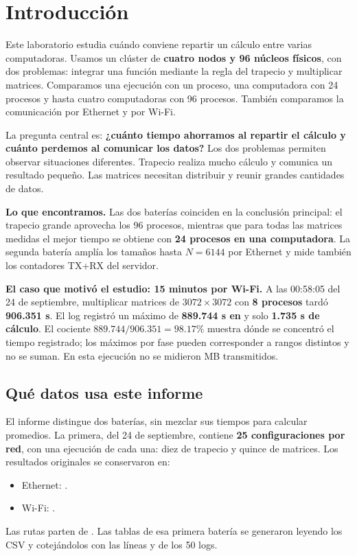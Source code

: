 \section{Introducción}

Este laboratorio estudia cuándo conviene repartir un cálculo entre varias computadoras. Usamos un clúster de \textbf{cuatro nodos y 96 núcleos físicos}, con dos problemas: integrar una función mediante la regla del trapecio y multiplicar matrices. Comparamos una ejecución con un proceso, una computadora con 24 procesos y hasta cuatro computadoras con 96 procesos. También comparamos la comunicación por Ethernet y por Wi-Fi.

La pregunta central es: \textbf{¿cuánto tiempo ahorramos al repartir el cálculo y cuánto perdemos al comunicar los datos?} Los dos problemas permiten observar situaciones diferentes. Trapecio realiza mucho cálculo y comunica un resultado pequeño. Las matrices necesitan distribuir y reunir grandes cantidades de datos.

\begin{idea}
\textbf{Lo que encontramos.} Las dos baterías coinciden en la conclusión principal: el trapecio grande aprovecha los 96 procesos, mientras que para todas las matrices medidas el mejor tiempo se obtiene con \textbf{24 procesos en una computadora}. La segunda batería amplía los tamaños hasta $N=6144$ por Ethernet y mide también los contadores TX+RX del servidor.
\end{idea}

\begin{idea}
\textbf{El caso que motivó el estudio: 15 minutos por Wi-Fi.} A las 00:58:05 del 24 de septiembre, multiplicar matrices de $3072\times3072$ con \textbf{8 procesos} tardó \textbf{906.351 s}. El log registró un máximo de \textbf{889.744 s en } y solo \textbf{1.735 s de cálculo}. El cociente $889.744/906.351=98.17\%$ muestra dónde se concentró el tiempo registrado; los máximos por fase pueden corresponder a rangos distintos y no se suman. En esta ejecución no se midieron MB transmitidos.
\end{idea}

\subsection{Qué datos usa este informe}
El informe distingue dos baterías, sin mezclar sus tiempos para calcular promedios. La primera, del 24 de septiembre, contiene \textbf{25 configuraciones por red}, con una ejecución de cada una: diez de trapecio y quince de matrices. Los resultados originales se conservaron en:
\begin{itemize}
\item Ethernet: .
\item Wi-Fi: .
\end{itemize}
Las rutas parten de . Las tablas de esa primera batería se generaron leyendo los CSV y cotejándolos con las líneas  y  de los 50 logs.

